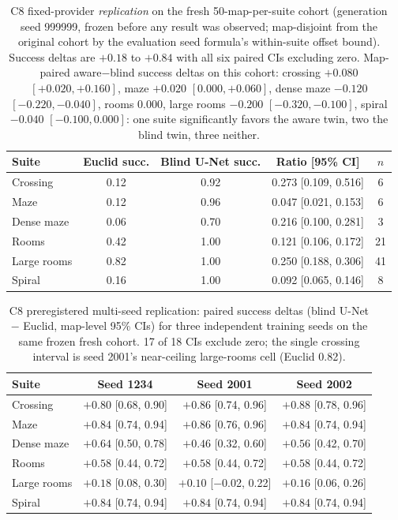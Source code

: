 \documentclass[letterpaper]{article} %
\newcommand{\stage}[1]{\textsc{#1}}
\begin{document}
\begin{table}[h]
\centering
\scriptsize
\setlength{\tabcolsep}{3pt}
\begin{tabular}{@{}lcccc@{}}
\toprule
Suite & Euclid succ. & Blind U-Net succ. & Ratio [95\% CI] & $n$ \\
\midrule
Crossing & 0.12 & 0.92 & 0.273 [0.109, 0.516] & 6 \\
Maze & 0.12 & 0.96 & 0.047 [0.021, 0.153] & 6 \\
Dense maze & 0.06 & 0.70 & 0.216 [0.100, 0.281] & 3 \\
Rooms & 0.42 & 1.00 & 0.121 [0.106, 0.172] & 21 \\
Large rooms & 0.82 & 1.00 & 0.250 [0.188, 0.306] & 41 \\
Spiral & 0.16 & 1.00 & 0.092 [0.065, 0.146] & 8 \\
\bottomrule
\end{tabular}
\caption{\stage{C8} fixed-provider \emph{replication} on the fresh 50-map-per-suite cohort (generation seed 999999, frozen before any result was observed; map-disjoint from the original cohort by the evaluation seed formula's within-suite offset bound). Success deltas are $+0.18$ to $+0.84$ with all six paired CIs excluding zero. Map-paired aware$-$blind success deltas on this cohort: crossing $+0.080$ $[+0.020,+0.160]$, maze $+0.020$ $[0.000,+0.060]$, dense maze $-0.120$ $[-0.220,-0.040]$, rooms $0.000$, large rooms $-0.200$ $[-0.320,-0.100]$, spiral $-0.040$ $[-0.100,0.000]$: one suite significantly favors the aware twin, two the blind twin, three neither.}
\label{tab:c8fresh}
\end{table}

\begin{table}[t]
\centering
\scriptsize
\setlength{\tabcolsep}{2.6pt}
\begin{tabular}{@{}lccc@{}}
\toprule
Suite & Seed 1234 & Seed 2001 & Seed 2002 \\
\midrule
Crossing & $+0.80$ [0.68, 0.90] & $+0.86$ [0.74, 0.96] & $+0.88$ [0.78, 0.96] \\
Maze & $+0.84$ [0.74, 0.94] & $+0.86$ [0.76, 0.96] & $+0.84$ [0.74, 0.94] \\
Dense maze & $+0.64$ [0.50, 0.78] & $+0.46$ [0.32, 0.60] & $+0.56$ [0.42, 0.70] \\
Rooms & $+0.58$ [0.44, 0.72] & $+0.58$ [0.44, 0.72] & $+0.58$ [0.44, 0.72] \\
Large rooms & $+0.18$ [0.08, 0.30] & $+0.10$ [$-$0.02, 0.22] & $+0.16$ [0.06, 0.26] \\
Spiral & $+0.84$ [0.74, 0.94] & $+0.84$ [0.74, 0.94] & $+0.84$ [0.74, 0.94] \\
\bottomrule
\end{tabular}
\caption{\stage{C8} preregistered multi-seed replication: paired success deltas (blind U-Net $-$ Euclid, map-level 95\% CIs) for three independent training seeds on the same frozen fresh cohort. 17 of 18 CIs exclude zero; the single crossing interval is seed 2001's near-ceiling large-rooms cell (Euclid 0.82).}
\label{tab:c8seeds}
\end{table}
\end{document}
